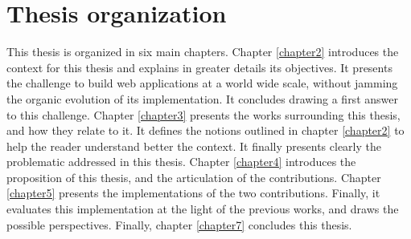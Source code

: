 \section{Thesis organization}

This thesis is organized in six main chapters.
Chapter \ref{chapter2} introduces the context for this thesis and explains in greater details its objectives.
It presents the challenge to build web applications at a world wide scale, without jamming the organic evolution of its implementation.
It concludes drawing a first answer to this challenge.
Chapter \ref{chapter3} presents the works surrounding this thesis, and how they relate to it.
It defines the notions outlined in chapter \ref{chapter2} to help the reader understand better the context.
It finally presents clearly the problematic addressed in this thesis.
Chapter \ref{chapter4} introduces the proposition of this thesis, and the articulation of the contributions.
Chapter \ref{chapter5} presents the implementations of the two contributions.
Finally, it evaluates this implementation at the light of the previous works, and draws the possible perspectives.
Finally, chapter \ref{chapter7} concludes this thesis.
